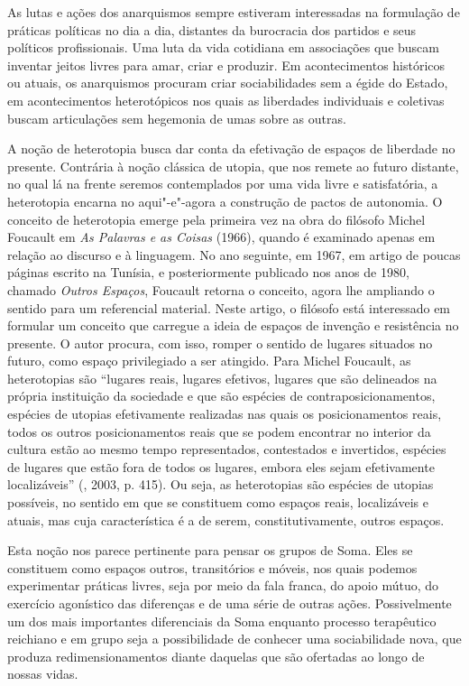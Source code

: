 As lutas e ações dos anarquismos sempre estiveram interessadas na
formulação de práticas políticas no dia a dia, distantes da burocracia
dos partidos e seus políticos profissionais. Uma luta da vida cotidiana
em associações que buscam inventar jeitos livres para amar, criar e
produzir. Em acontecimentos históricos ou atuais, os anarquismos
procuram criar sociabilidades sem a égide do Estado, em acontecimentos
heterotópicos nos quais as liberdades individuais e coletivas buscam
articulações sem hegemonia de umas sobre as outras.

A noção de heterotopia busca dar conta da efetivação de espaços de
liberdade no presente. Contrária à noção clássica de utopia, que nos
remete ao futuro distante, no qual lá na frente seremos contemplados por
uma vida livre e satisfatória, a heterotopia encarna no aqui"-e"-agora
a construção de pactos de autonomia. O conceito de heterotopia emerge
pela primeira vez na obra do filósofo Michel Foucault em \emph{As
Palavras e as Coisas} (1966), quando é examinado apenas em relação ao
discurso e à linguagem. No ano seguinte, em 1967, em artigo de poucas
páginas escrito na Tunísia, e posteriormente publicado nos anos de 1980,
chamado \emph{Outros Espaços}, Foucault retorna o conceito, agora lhe
ampliando o sentido para um referencial material. Neste artigo, o
filósofo está interessado em formular um conceito que carregue a ideia
de espaços de invenção e resistência no presente. O autor procura, com
isso, romper o sentido de lugares situados no futuro, como espaço
privilegiado a ser atingido. Para Michel Foucault, as heterotopias são
``lugares reais, lugares efetivos, lugares que são delineados na própria
instituição da sociedade e que são espécies de contraposicionamentos,
espécies de utopias efetivamente realizadas nas quais os posicionamentos
reais, todos os outros posicionamentos reais que se podem encontrar no
interior da cultura estão ao mesmo tempo representados, contestados e
invertidos, espécies de lugares que estão fora de todos os lugares,
embora eles sejam efetivamente localizáveis'' (, 2003, p. 415).
Ou seja, as heterotopias são espécies de utopias possíveis, no sentido
em que se constituem como espaços reais, localizáveis e atuais, mas cuja
característica é a de serem, constitutivamente, outros espaços.

Esta noção nos parece pertinente para pensar os grupos de Soma. Eles se
constituem como espaços outros, transitórios e móveis, nos quais podemos
experimentar práticas livres, seja por meio da fala franca, do apoio
mútuo, do exercício agonístico das diferenças e de uma série de outras
ações. Possivelmente um dos mais importantes diferenciais da Soma
enquanto processo terapêutico reichiano e em grupo seja a possibilidade
de conhecer uma sociabilidade nova, que produza redimensionamentos
diante daquelas que são ofertadas ao longo de nossas vidas.

